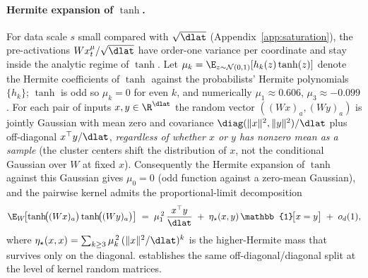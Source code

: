 \paragraph{Hermite expansion of $\tanh$.}
For data scale $s$ small compared with $\sqrt{\dlat}$
(Appendix~\ref{app:saturation}), the pre-activations
$Wx_t^\mu/\sqrt{\dlat}$ have order-one variance per coordinate and stay
inside the analytic regime of $\tanh$. Let
$\mu_k = \E_{z\sim\mathcal{N}(0,1)}[h_k(z)\tanh(z)]$ denote the
Hermite coefficients of $\tanh$ against the probabilists' Hermite
polynomials $\{h_k\}$; $\tanh$ is odd so $\mu_k = 0$ for even $k$,
and numerically $\mu_1 \approx 0.606$, $\mu_3 \approx -0.099$.
For each pair of inputs $x,y\in\R^{\dlat}$ the random vector
$((Wx)_a,(Wy)_a)$ is jointly Gaussian with mean zero and covariance
$\diag(\|x\|^2,\|y\|^2)/\dlat$ plus off-diagonal $x^\top y/\dlat$,
\emph{regardless of whether $x$ or $y$ has nonzero mean as a sample}
(the cluster centers shift the distribution of $x$, not the
conditional Gaussian over $W$ at fixed $x$). Consequently the Hermite
expansion of $\tanh$ against this Gaussian gives $\mu_0=0$
(odd function against a zero-mean Gaussian), and the pairwise kernel
admits the proportional-limit decomposition
\citep{pennington2017nonlinear, benigni2021eigenvalue}
\begin{equation}
  \E_W\!\bigl[\tanh\!\bigl((Wx)_a\bigr)\tanh\!\bigl((Wy)_a\bigr)\bigr]
   \;=\; \mu_1^{\,2}\,\frac{x^\top y}{\dlat}
        \;+\; \eta_\star(x,y)\,\mathbb{1}\!\bigl[x=y\bigr]
        \;+\; o_d(1),
  \label{eq:kernel-decomp}
\end{equation}
where $\eta_\star(x,x) = \sum_{k\ge 3}\mu_k^{\,2}\,(\|x\|^2/\dlat)^k$
is the higher-Hermite mass that survives only on the diagonal.
\citet{ELKaroui2010spectrum} establishes the same off-diagonal/diagonal
split at the level of kernel random matrices.

